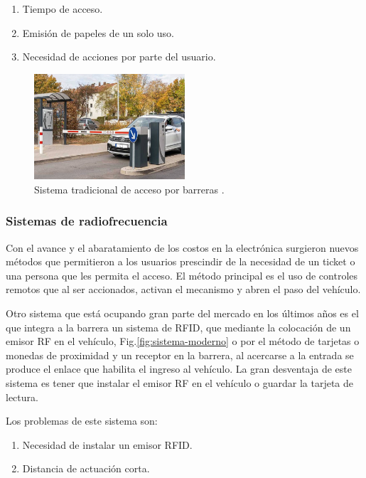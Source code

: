 \begin{enumerate}
    \item Tiempo de acceso.
    \item Emisión de papeles de un solo uso.
    \item Necesidad de acciones por parte del usuario.
\end{enumerate}

\begin{figure}
    \centering
    \includegraphics[width=0.5\textwidth]{imgs/sistema-control-acceso-barreras.jpg}
    \caption{Sistema tradicional de acceso por barreras \cite{integralia_sistema_2019}.}
    \label{fig:sistema-tradicional}
\end{figure}

\subsubsection*{Sistemas de radiofrecuencia}

Con el avance y el abaratamiento de los costos en la electrónica surgieron nuevos métodos que permitieron a los usuarios prescindir de la necesidad de un ticket o una persona que les permita el acceso. El método principal es el uso de controles remotos que al ser accionados, activan el mecanismo y abren el paso del vehículo.

Otro sistema que está ocupando gran parte del mercado en los últimos años es el que integra a la barrera un sistema de RFID, que mediante la colocación de un emisor RF en el vehículo, Fig.\ref{fig:sistema-moderno} o por el método de tarjetas o monedas de proximidad y un receptor en la barrera, al acercarse a la entrada se produce el enlace que habilita el ingreso al vehículo. La gran desventaja de este sistema es tener que instalar el emisor RF en el vehículo o guardar la tarjeta de lectura.

Los problemas de este sistema son:

\begin{enumerate}
    \item Necesidad de instalar un emisor RFID.
    \item Distancia de actuación corta.
\end{enumerate}

